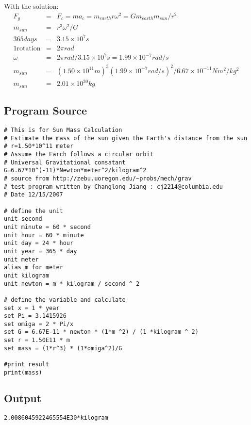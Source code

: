 With the solution:
\begin{eqnarray*}
F_{g} & = & F_{c} = ma_{c} = m_{earth}r\omega^{2} = Gm_{earth}m_{sun}/r^{2} \\
m_{sun} & = & r^{3}\omega^{2}/G \\
365 days & = & 3.15 \times 10^{7}s \\
1 \mathrm{rotation} & = & 2 \pi rad \\
\omega & = & 2 \pi rad / 3.15 \times 10^{7}s = 1.99 \times 10^{-7} rad/s \\
m_{sun} & = & (1.50 \times 10^{11}m)^{3}(1.99 \times 10^{-7} rad/s)^{2}/6.67 \times 10^{-11} Nm^{2}/kg^{2} \\
m_{sun} & = & 2.01 \times 10^{30}kg
\end{eqnarray*}


\subsection{Program Source}

\begin{verbatim}
# This is for Sun Mass Calculation
# Estimate the mass of the sun given the Earth's distance from the sun
# r=1.50*10^11 meter
# Assume the Earch follows a circular orbit
# Universal Gravitational consatant G=6.67*10^(-11)*Newton*meter^2/kilogram^2
# source from http://zebu.uoregon.edu/~probs/mech/grav
# test program written by Changlong Jiang : cj2214@columbia.edu
# Date 12/15/2007 

# define the unit
unit second
unit minute = 60 * second
unit hour = 60 * minute
unit day = 24 * hour
unit year = 365 * day 
unit meter
alias m for meter
unit kilogram
unit newton = m * kilogram / second ^ 2 

# define the variable and calculate
set x = 1 * year
set Pi = 3.1415926
set omiga = 2 * Pi/x
set G = 6.67E-11 * newton * (1*m ^2) / (1 *kilogram ^ 2)
set r = 1.50E11 * m
set mass = (1*r^3) * (1*omiga^2)/G 

#print result
print(mass) 
\end{verbatim}

\subsection{Output}

\begin{verbatim}
2.0086045922465554E30*kilogram 
\end{verbatim}



